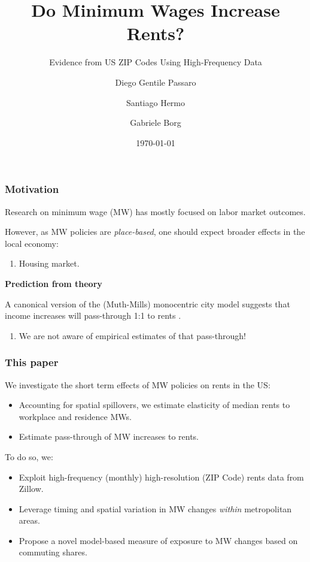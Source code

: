 \documentclass[aspectratio=169, t]{beamer}
\title{Do Minimum Wages Increase Rents?}
\subtitle{Evidence from US ZIP Codes Using High-Frequency Data}
\date{\today}
\author{Diego Gentile Passaro \and Santiago Hermo \and Gabriele Borg}
\institute{Brown University $ \quad\quad\quad\quad $ Brown University $ \quad\quad\quad\quad$  AWS}
\begin{document}
\maketitle



\begin{frame}
	\frametitle{Motivation}
	
	Research on minimum wage (MW) has mostly focused on labor market outcomes.
	
	\vspace{1.5mm}

	However, as MW policies are \textit{place-based}, one should expect broader effects 
	in the local economy:
	\begin{enumerate}[$\Rightarrow $]
		\item Housing market.
	\end{enumerate}

	\pause
	\vspace{3mm}
	\textbf{Prediction from theory}
	
    A canonical version of the (Muth-Mills) monocentric city model suggests that income increases will 
    pass-through 1:1 to rents \parencite{Brueckner1987}.  
    \begin{enumerate}[$\Rightarrow $]
		\item We are not aware of empirical estimates of that pass-through!
	\end{enumerate}
\end{frame}

\begin{frame}
	\frametitle{This paper}
	We investigate the short term effects of MW policies on rents in the US:
	\begin{itemize}
		\vspace{.5mm} \item Accounting for spatial spillovers, we estimate 
		elasticity of median rents to workplace and residence MWs.
		\vspace{.5mm} \item Estimate pass-through of MW increases to rents.
	\end{itemize}
	
	\vspace{3mm}
	\pause
	To do so, we:
	\begin{itemize}
    	\vspace{.5mm} \item Exploit high-frequency (monthly) high-resolution 
    	(ZIP Code) rents data from Zillow.
    	\vspace{.5mm} \item Leverage timing and spatial variation in MW changes 
    	\textit{within} metropolitan areas.
    	\vspace{.5mm} \item Propose a novel model-based measure of exposure to MW 
		changes based on commuting shares.
	\end{itemize}
\end{frame}
\end{document}
